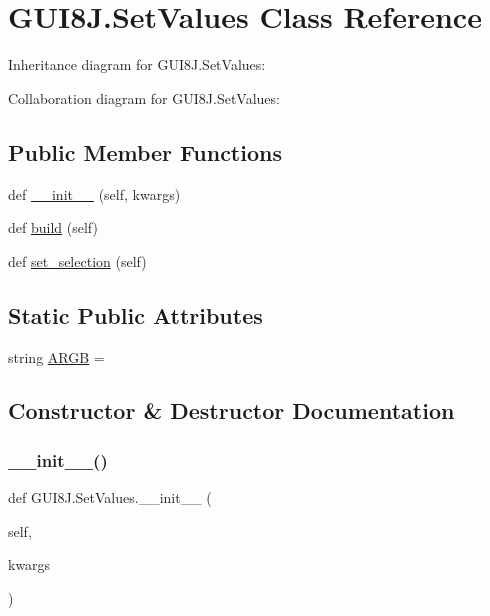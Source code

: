 \hypertarget{classGUI8J_1_1SetValues}{}\section{G\+U\+I8\+J.\+Set\+Values Class Reference}
\label{classGUI8J_1_1SetValues}


Inheritance diagram for G\+U\+I8\+J.\+Set\+Values\+:


Collaboration diagram for G\+U\+I8\+J.\+Set\+Values\+:
\subsection*{Public Member Functions}
\begin{DoxyCompactItemize}
\item 
def \hyperlink{classGUI8J_1_1SetValues_a50aecbed585d5eb0dd5d48e810b89303}{\+\_\+\+\_\+init\+\_\+\+\_\+} (self, kwargs)
\item 
def \hyperlink{classGUI8J_1_1SetValues_ac327a506ed4ef380a0e6cffdc7125a94}{build} (self)
\item 
def \hyperlink{classGUI8J_1_1SetValues_ad395153098290dc55aa98bb3cbe15a44}{set\+\_\+selection} (self)
\end{DoxyCompactItemize}
\subsection*{Static Public Attributes}
\begin{DoxyCompactItemize}
\item 
string \hyperlink{classGUI8J_1_1SetValues_a51db2b8ea02f885122e64c2dbe632705}{A\+R\+GB} = \textquotesingle{}\textquotesingle{}
\end{DoxyCompactItemize}


\subsection{Constructor \& Destructor Documentation}
\mbox{\label{classGUI8J_1_1SetValues_a50aecbed585d5eb0dd5d48e810b89303}} 
\subsubsection{\texorpdfstring{\+\_\+\+\_\+init\+\_\+\+\_\+()}{\_\_init\_\_()}}
{\footnotesize\ttfamily def G\+U\+I8\+J.\+Set\+Values.\+\_\+\+\_\+init\+\_\+\+\_\+ (\begin{DoxyParamCaption}\item[{}]{self,  }\item[{}]{kwargs }\end{DoxyParamCaption})}



